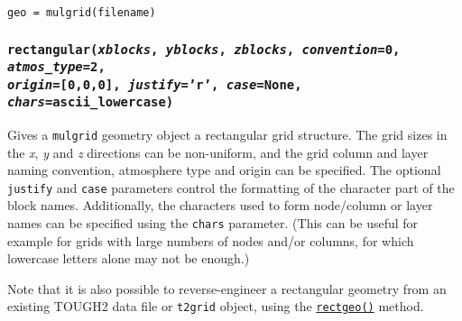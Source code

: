 \begin{lstlisting}
geo = mulgrid(filename)
\end{lstlisting}

\begin{snugshade}
\subsubsection{\texttt{rectangular(\emph{xblocks}, \emph{yblocks}, \emph{zblocks}, \emph{convention}=0, \emph{atmos\_type}=2,\\
    \emph{origin}=[0,0,0], \emph{justify}='r', \emph{case}=None, \emph{chars}=ascii\_lowercase)}}\end{snugshade}
\label{sec:mulgrid:rectangular}

Gives a \texttt{mulgrid} geometry object a rectangular grid structure.  The grid sizes in the \emph{x}, \emph{y} and \emph{z} directions can be non-uniform, and the grid column and layer naming convention, atmosphere type and origin can be specified.  The optional \texttt{justify} and \texttt{case} parameters control the formatting of the character part of the block names.  Additionally, the characters used to form node/column or layer names can be specified using the \texttt{chars} parameter.  (This can be useful for example for grids with large numbers of nodes and/or columns, for which lowercase letters alone may not be enough.)

Note that it is also possible to reverse-engineer a rectangular geometry from an existing TOUGH2 data file or \texttt{t2grid} object, using the \hyperref[sec:t2grid:rectgeo]{\texttt{rectgeo()}} method.

